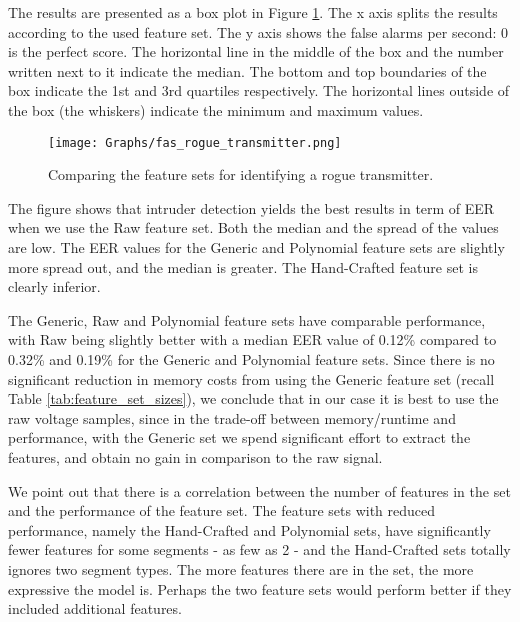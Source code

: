\documentclass[english]{llncs}
\begin{document}
  The results are presented as a box plot in Figure \ref{fig:rogue_transmitter_results}. The x axis splits the results according to the used feature set. The y axis shows the false alarms per second:
  0 is the perfect score. The horizontal line in the middle of the box and the number written next to it indicate the median. The bottom and top boundaries of the box indicate the 1st and 3rd quartiles respectively. The horizontal lines outside of the box (the whiskers) indicate the minimum and maximum values.
  
  \begin{figure}[t]
    \centering
    \texttt{[image: Graphs/fas\_rogue\_transmitter.png]}
    \caption{Comparing the feature sets for identifying a rogue transmitter.} 
    \label{fig:rogue_transmitter_results}
  \end{figure}
  
  The figure shows that intruder detection yields the best results in term of EER when we use the Raw feature set. Both the median and the spread of the values are low. The EER values for the Generic and Polynomial feature sets are slightly more spread out, and the median is greater. The Hand-Crafted feature set is clearly inferior.
  
  The Generic, Raw and Polynomial feature sets have comparable performance, with Raw being slightly better with a median EER value of 0.12\% compared to 0.32\% and 0.19\% for the Generic and Polynomial feature sets. Since there is no significant reduction in memory costs from using the Generic feature set (recall Table \ref{tab:feature_set_sizes}), we conclude that in our case it is best to use the raw voltage samples, since in the trade-off between memory/runtime and performance, with the Generic set we spend significant effort to extract the features, and obtain no gain in comparison to the raw signal.
  
  We point out that there is a correlation between the number of features in the set and the performance of the feature set. The feature sets with reduced performance, namely the Hand-Crafted and Polynomial sets, have significantly fewer features for some segments - as few as 2 - and the Hand-Crafted sets totally ignores two segment types. The more features there are in the set, the more expressive the model is. Perhaps the two feature sets would perform better if they included additional features.
  
\end{document}

